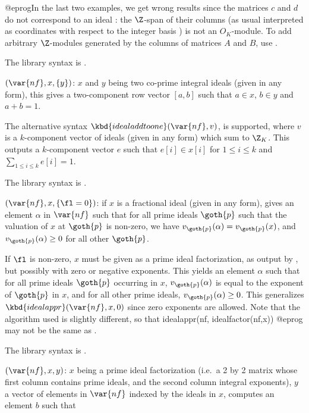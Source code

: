 @eprog\noindent In the last two examples, we get wrong results since the
matrices $c$ and $d$ do not correspond to an ideal : the $\Z$-span of their
columns (as usual interpreted as coordinates with respect to the integer basis
) is not an $O_K$-module. To add arbitrary $\Z$-modules generated
by the columns of matrices $A$ and $B$, use .

The library syntax is .

$(\var{nf},x,\{y\})$: \label{se:idealaddtoone}$x$ and $y$ being two co-prime
integral ideals (given in any form), this gives a two-component row vector
$[a,b]$ such that $a\in x$, $b\in y$ and $a+b=1$.

The alternative syntax $\kbd{idealaddtoone}(\var{nf},v)$, is supported, where
$v$ is a $k$-component vector of ideals (given in any form) which sum to
$\Z_K$. This outputs a $k$-component vector $e$ such that $e[i]\in x[i]$ for
$1\le i\le k$ and $\sum_{1\le i\le k}e[i]=1$.

The library syntax is .

$(\var{nf},x,\{\fl=0\})$: \label{se:idealappr}if $x$ is a fractional ideal
(given in any form), gives an element $\alpha$ in $\var{nf}$ such that for
all prime ideals $\goth{p}$ such that the valuation of $x$ at $\goth{p}$ is
non-zero, we have $v_{\goth{p}}(\alpha)=v_{\goth{p}}(x)$, and
$v_{\goth{p}}(\alpha)\ge0$ for all other $\goth{p}$.

If $\fl$ is non-zero, $x$ must be given as a prime ideal factorization, as
output by , but possibly with zero or negative exponents.
This yields an element $\alpha$ such that for all prime ideals $\goth{p}$
occurring in $x$, $v_{\goth{p}}(\alpha)$ is equal to the exponent of
$\goth{p}$ in $x$, and for all other prime ideals,
$v_{\goth{p}}(\alpha)\ge0$. This generalizes $\kbd{idealappr}(\var{nf},x,0)$
since zero exponents are allowed. Note that the algorithm used is slightly
different, so that
\bprog
  idealappr(nf, idealfactor(nf,x))
@eprog\noindent
may not be the same as .

The library syntax is .

$(\var{nf},x,y)$: \label{se:idealchinese}$x$ being a prime ideal factorization
(i.e.~a 2 by 2 matrix whose first column contains prime ideals, and the second
column integral exponents), $y$ a vector of elements in $\var{nf}$ indexed by
the ideals in $x$, computes an element $b$ such that

